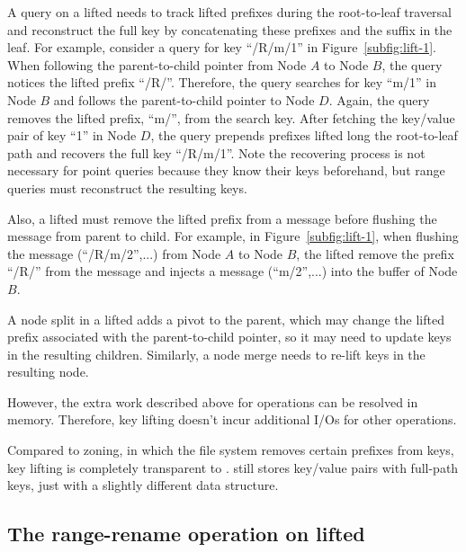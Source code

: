 A query on a lifted \bet needs to track lifted prefixes during the
root-to-leaf traversal and reconstruct the full key by concatenating these
prefixes and the suffix in the leaf.
For example, consider a query for key ``/R/m/1'' in Figure~\ref{subfig:lift-1}.
When following the parent-to-child pointer from Node $A$ to Node $B$,
the query notices the lifted prefix ``/R/''.
Therefore, the query searches for key ``m/1'' in Node $B$ and follows the
parent-to-child pointer to Node $D$.
Again, the query removes the lifted prefix, ``m/'', from the search key.
After fetching the key/value pair of key ``1'' in Node $D$, the query prepends
prefixes lifted long the root-to-leaf path and recovers the full key ``/R/m/1''.
Note the recovering process is not necessary for point queries because they know
their keys beforehand, but range queries must reconstruct the resulting keys.

Also, a lifted \bet must remove the lifted prefix from a message before flushing
the message from parent to child.
For example, in Figure~\ref{subfig:lift-1}, when flushing the message
\putm(``/R/m/2'',...) from Node $A$ to Node $B$, the lifted \bet remove the
prefix ``/R/'' from the message and injects a message \putm(``m/2'',...) into
the buffer of Node $B$.

A node split in a lifted \bet adds a pivot to the parent, which may change
the lifted prefix associated with the parent-to-child pointer, so it may need to
update keys in the resulting children.
Similarly, a node merge needs to re-lift keys in the resulting node.

However, the extra work described above for \bet operations can be resolved in
memory.
Therefore, key lifting doesn't incur additional I/Os for other \bet operations.

Compared to zoning, in which the file system removes certain prefixes from keys,
key lifting is completely transparent to \betrfs.
\betrfs still stores key/value pairs with full-path keys,
just with a slightly different data structure.

\subsection{The range-rename operation on lifted \bets}
\label{sec:rr:op:rr}

